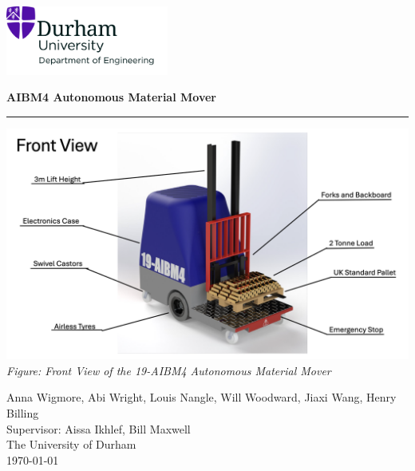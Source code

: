 \documentclass[12pt]{article}
\begin{document}
\begin{titlepage}                                             %
\pagestyle{empty}                                             %
\centering                                                    %

\includegraphics[width=0.4\textwidth]{UoD_Engineering.jpg} \\
\vspace{20mm}                                                 %

{\LARGE \textbf{AIBM4 Autonomous Material Mover}} \\[10pt]  %
 

\vspace{5mm}\hrule\vspace{15mm}                               %

\includegraphics[width=1\textwidth]{Screenshot 2024-11-14 at 17.52.59.png}  \\  %
\vspace{5mm}
\textit{Figure: Front View of the 19-AIBM4 Autonomous Material Mover} \\

\vspace{20mm}                                                 %

{\large Anna Wigmore, Abi Wright, Louis Nangle, Will Woodward, Jiaxi Wang, Henry Billing} \\ \vspace{2mm} %
{Supervisor: Aissa Ikhlef, Bill Maxwell } \\[10pt]  %
{\small The University of Durham \\ \today}                   %

\end{titlepage}
\end{document}
